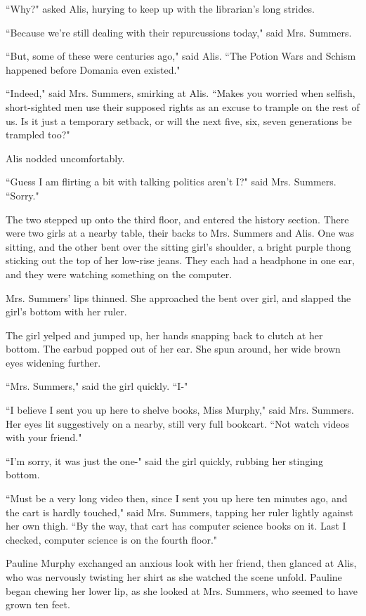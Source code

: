 \documentclass{report}
\begin{document}
``Why?" asked Alis, hurying to keep up with the librarian's long strides.

``Because we're still dealing with their repurcussions today," said Mrs. Summers.

``But, some of these were centuries ago," said Alis. ``The Potion Wars and Schism happened before Domania even existed."

``Indeed," said Mrs. Summers, smirking at Alis. ``Makes you worried when selfish, short-sighted men use their supposed rights as an excuse to trample on the rest of 
us. Is it just a temporary setback, or will the next five, six, seven generations be trampled too?" 

Alis nodded uncomfortably. 

``Guess I am flirting a bit with talking politics aren't I?" said Mrs. Summers. ``Sorry."

The two stepped up onto the third floor, and entered the history section. There were two girls at a nearby table, their backs to Mrs. Summers and Alis. 
One was sitting, and the other bent over the sitting girl's shoulder, a bright purple thong sticking out the top of her low-rise jeans. They
each had a headphone in one ear, and they were watching something on the computer.

Mrs. Summers' lips thinned. She approached the bent over girl, and slapped the girl's bottom with her ruler.

The girl yelped and jumped up, her hands snapping back to clutch at her bottom. The earbud popped out of her ear. She spun around, her wide brown eyes widening further.

``Mrs. Summers," said the girl quickly. ``I-"

``I believe I sent you up here to shelve books, Miss Murphy," said Mrs. Summers. Her eyes lit suggestively on a nearby, still very full bookcart. ``Not watch videos with
your friend."

``I'm sorry, it was just the one-" said the girl quickly, rubbing her stinging bottom.

``Must be a very long video then, since I sent you up here ten minutes ago, and the cart is hardly touched," said Mrs. Summers, tapping her ruler lightly against her own
thigh. ``By the way, that cart has computer science books on it. Last I checked, computer science is on the fourth floor."

Pauline Murphy exchanged an anxious look with her friend, then glanced at Alis, who was nervously twisting her shirt as she watched the scene unfold. Pauline began chewing 
her lower lip, as she looked at Mrs. Summers, who seemed to have grown ten feet.
\end{document}

